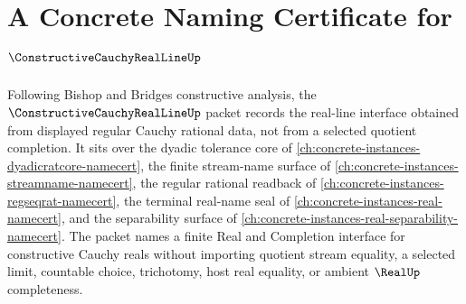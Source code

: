 \chapter{A Concrete Naming Certificate for $\ConstructiveCauchyRealLineUp$}
\label{ch:concrete-instances-constructive-cauchy-real-line-namecert}

Following Bishop and Bridges constructive analysis, the $\ConstructiveCauchyRealLineUp$ packet records the real-line interface obtained from displayed regular Cauchy rational data, not from a selected quotient completion. It sits over the dyadic tolerance core of \autoref{ch:concrete-instances-dyadicratcore-namecert}, the finite stream-name surface of \autoref{ch:concrete-instances-streamname-namecert}, the regular rational readback of \autoref{ch:concrete-instances-regseqrat-namecert}, the terminal real-name seal of \autoref{ch:concrete-instances-real-namecert}, and the separability surface of \autoref{ch:concrete-instances-real-separability-namecert}. The packet names a finite Real and Completion interface for constructive Cauchy reals without importing quotient stream equality, a selected limit, countable choice, trichotomy, host real equality, or ambient $\RealUp$ completeness.

